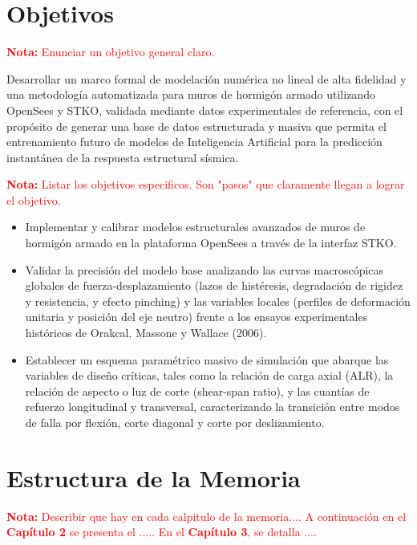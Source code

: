 \section{Objetivos}

\textcolor{red}{\textbf{Nota: }Enunciar un objetivo general claro.}

\bigskip 

Desarrollar un marco formal de modelación numérica no lineal de alta fidelidad y una metodología automatizada para muros de hormigón armado utilizando OpenSees y STKO, validada mediante datos experimentales de referencia, con el propósito de generar una base de datos estructurada y masiva que permita el entrenamiento futuro de modelos de Inteligencia Artificial para la predicción instantánea de la respuesta estructural sísmica.

\bigskip

\textcolor{red}{\textbf{Nota: }Listar los objetivos especificos. Son "pasos" que claramente llegan a lograr el objetivo.}

\begin{itemize}
  \item Implementar y calibrar modelos estructurales avanzados de muros de hormigón armado en la plataforma OpenSees a través de la interfaz STKO.
  \item Validar la precisión del modelo base analizando las curvas macroscópicas globales de fuerza-desplazamiento (lazos de histéresis, degradación de rigidez y resistencia, y efecto pinching) y las variables locales (perfiles de deformación unitaria y posición del eje neutro) frente a los ensayos experimentales históricos de Orakcal, Massone y Wallace (2006).
  \item Establecer un esquema paramétrico masivo de simulación que abarque las variables de diseño críticas, tales como la relación de carga axial (ALR), la relación de aspecto o luz de corte (shear-span ratio), y las cuantías de refuerzo longitudinal y transversal, caracterizando la transición entre modos de falla por flexión, corte diagonal y corte por deslizamiento.
\end{itemize}

\section{Estructura de la Memoria}

\textcolor{red}{\textbf{Nota: } Describir que hay en cada calpitulo de la memoria.... 
A continuación en el \textbf{Capítulo 2} se presenta el .....
En el \textbf{Capítulo 3}, se detalla ....}



